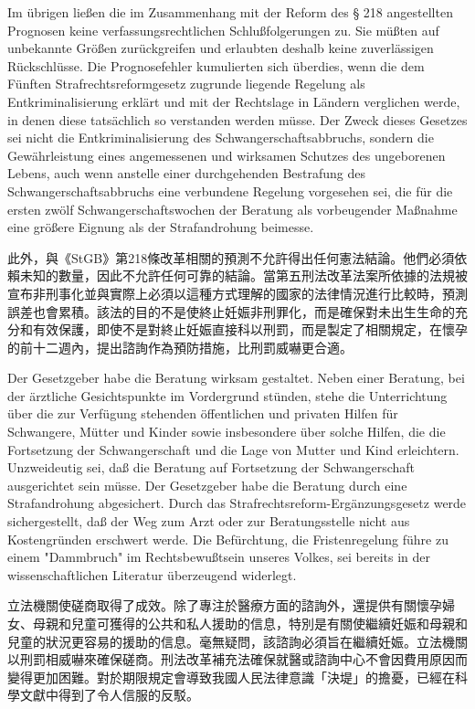 \documentclass[12pt]{article}
\begin{document}
\syncleft
\begin{sourcepara}
Im übrigen ließen die im Zusammenhang mit der Reform des § 218 \abbrStGB{} angestellten Prognosen keine verfassungsrechtlichen Schlußfolgerungen zu. Sie müßten auf unbekannte Größen zurückgreifen und erlaubten deshalb keine zuverlässigen Rückschlüsse. Die Prognosefehler kumulierten sich überdies, wenn die dem Fünften Strafrechtsreformgesetz zugrunde liegende Regelung als Entkriminalisierung erklärt und mit der Rechtslage in Ländern verglichen werde, in denen diese tatsächlich so verstanden werden müsse. Der Zweck dieses Gesetzes sei nicht die Entkriminalisierung des Schwangerschaftsabbruchs, sondern die Gewährleistung eines angemessenen und wirksamen Schutzes des ungeborenen Lebens, auch wenn anstelle einer durchgehenden Bestrafung des Schwangerschaftsabbruchs eine verbundene Regelung vorgesehen sei, die für die ersten zwölf Schwangerschaftswochen der Beratung als vorbeugender Maßnahme eine größere Eignung als der Strafandrohung beimesse.
\end{sourcepara}
\begin{transpara}
此外，與《StGB》第218條改革相關的預測不允許得出任何憲法結論。他們必須依賴未知的數量，因此不允許任何可靠的結論。當第五刑法改革法案所依據的法規被宣布非刑事化並與實際上必須以這種方式理解的國家的法律情況進行比較時，預測誤差也會累積。該法的目的不是使終止妊娠非刑罪化，而是確保對未出生生命的充分和有效保護，即使不是對終止妊娠直接科以刑罰，而是製定了相關規定，在懷孕的前十二週內，提出諮詢作為預防措施，比刑罰威嚇更合適。
\end{transpara}

\syncleft
\begin{sourcepara}
Der Gesetzgeber habe die Beratung wirksam gestaltet. Neben einer Beratung, bei der ärztliche Gesichtspunkte im Vordergrund stünden, stehe die Unterrichtung über die zur Verfügung stehenden öffentlichen und privaten Hilfen für Schwangere, Mütter und Kinder sowie insbesondere über solche Hilfen, die die Fortsetzung der Schwangerschaft und die Lage von Mutter und Kind erleichtern. Unzweideutig sei, daß die Beratung auf Fortsetzung der Schwangerschaft ausgerichtet sein müsse. Der Gesetzgeber habe die Beratung durch eine Strafandrohung abgesichert. Durch das Strafrechtsreform-Ergänzungsgesetz werde sichergestellt, daß der Weg zum Arzt oder zur Beratungsstelle nicht aus Kostengründen erschwert werde. Die Befürchtung, die Fristenregelung führe zu einem "Dammbruch" im Rechtsbewußtsein unseres Volkes, sei bereits in der wissenschaftlichen Literatur überzeugend widerlegt.
\end{sourcepara}
\begin{transpara}
立法機關使磋商取得了成效。除了專注於醫療方面的諮詢外，還提供有關懷孕婦女、母親和兒童可獲得的公共和私人援助的信息，特別是有關使繼續妊娠和母親和兒童的狀況更容易的援助的信息。毫無疑問，該諮詢必須旨在繼續妊娠。立法機關以刑罰相威嚇來確保磋商。刑法改革補充法確保就醫或諮詢中心不會因費用原因而變得更加困難。對於期限規定會導致我國人民法律意識「決堤」的擔憂，已經在科學文獻中得到了令人信服的反駁。
\end{transpara}
\end{document}
